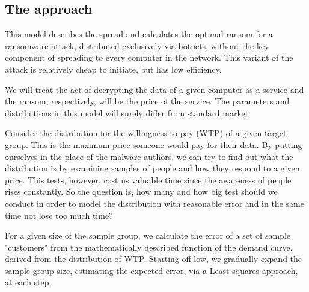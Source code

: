 \documentclass[11pt, a4paper]{article}
\begin{document}
	\subsection{The approach}
		This model describes the spread and calculates the optimal ransom for a ransomware attack, distributed exclusively via botnets, without the key component of spreading to every computer in the network. This variant of the attack is relatively cheap to initiate, but has low efficiency.\par
		We will treat the act of decrypting the data of a given computer as a service and the ransom, respectively, will be the price of the service. The parameters and distributions in this model will surely differ from standard market\par
		Consider the distribution for the willingness to pay (WTP) of a given target group. This is the maximum price someone would pay for their data. By putting ourselves in the place of the malware authors, we can try to find out what the distribution is by examining samples of people and how they respond to a given price. This tests, however, cost us valuable time since the awareness of people rises constantly. So the question is, how many and how big test should we conduct in order to model the distribution with reasonable error and in the same time not lose too much time?\par
		For a given size of the sample group, we calculate the error of a set of sample "customers" from the mathematically described function of the demand curve, derived from the distribution of WTP. Starting off low, we gradually expand the sample group size, estimating the expected error, via a Least squares approach, at each step.
\end{document}
